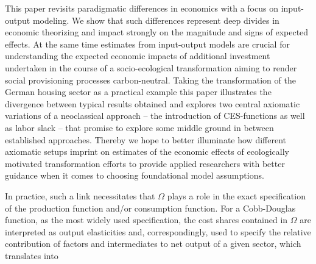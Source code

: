 This paper revisits paradigmatic differences in economics with a focus on input-output modeling. We show that such differences represent deep divides in economic theorizing and impact strongly on the magnitude and signs of expected effects. At the same time estimates from input-output models are crucial for understanding the expected economic impacts of additional investment undertaken in the course of a socio-ecological transformation aiming to render social provisioning processes carbon-neutral. Taking the transformation of the German housing sector as a practical example this paper illustrates the divergence between typical results obtained and explores two central axiomatic variations of a neoclassical approach -- the introduction of CES-functions as well as labor slack -- that promise to explore some middle ground in between established approaches. Thereby we hope to better illuminate how different axiomatic setups imprint on estimates of the economic effects of ecologically motivated transformation efforts to provide applied researchers with better guidance when it comes to choosing foundational model assumptions.




In practice, such a link necessitates that $\Omega$ plays a role in the exact specification of the production function and/or consumption function. For a Cobb-Douglas function, as the most widely used specification, the cost shares contained in $\Omega$ are interpreted as output elasticities and, correspondingly, used to specify the relative contribution of factors and intermediates to net output of a given sector, which translates into


